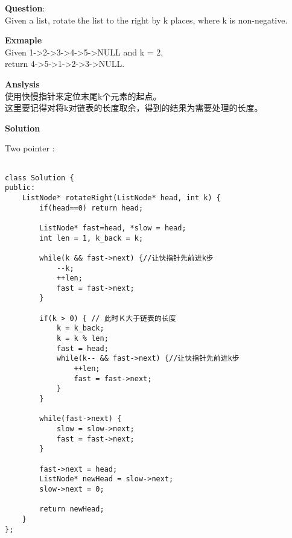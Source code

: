     
\begin{description}
    \item{\textbf{Question}}:\\%
		Given a list, rotate the list to the right by k places, where k is non-negative.

    \item{\textbf{Exmaple}}\\
		Given 1->2->3->4->5->NULL and k = 2,\\
		return 4->5->1->2->3->NULL.

    \item{\textbf{Anslysis}}\\
		使用快慢指针来定位末尾k个元素的起点。\\
		这里要记得对将k对链表的长度取余，得到的结果为需要处理的长度。\\

    \item{\textbf{Solution}}
	\item{Two pointer} : \\
		\begin{lstlisting}

class Solution {
public:
    ListNode* rotateRight(ListNode* head, int k) {
		if(head==0)	return head;

		ListNode* fast=head, *slow = head;
		int len = 1, k_back = k;

		while(k && fast->next) {//让快指针先前进k步
			--k;
			++len;
			fast = fast->next;
		}

		if(k > 0) { // 此时Ｋ大于链表的长度 
			k = k_back;
			k = k % len;
			fast = head;
			while(k-- && fast->next) {//让快指针先前进k步
				++len;
				fast = fast->next;
			}
		}

		while(fast->next) {
			slow = slow->next;
			fast = fast->next;
		}

		fast->next = head;
		ListNode* newHead = slow->next;
		slow->next = 0;

		return newHead;
    }
};
		\end{lstlisting}

\end{description}

